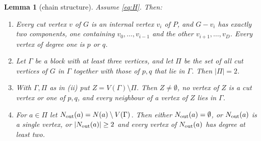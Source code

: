 \documentclass[11pt]{article}
\newtheorem{lemma}[theorem]{Lemma}
\theoremstyle{definition}
\theoremstyle{remark}
\newcommand{\D}{D}
\begin{document}
\begin{lemma}[chain structure]\label{lem:chain}
Assume \eqref{eq:H}. Then:
\begin{enumerate}[label=\textup{(\roman*)}]
\item Every cut vertex $v$ of $G$ is an internal vertex $v_i$ of $P$, and $G-v_i$ has exactly
 two components, one containing $v_0,\dots,v_{i-1}$ and the other $v_{i+1},\dots,v_\D$. Every
 vertex of degree one is $p$ or $q$.
\item Let $\Gamma$ be a block with at least three vertices, and let $\Pi$ be the set of all
 cut vertices of $G$ in $\Gamma$ together with those of $p,q$ that lie in $\Gamma$. Then
 $|\Pi|=2$.
\item With $\Gamma,\Pi$ as in \textup{(ii)} put $Z=V(\Gamma)\setminus\Pi$. Then $Z\ne\emptyset$,
 no vertex of $Z$ is a cut vertex or one of $p,q$, and every neighbour of a vertex of $Z$ lies
 in $\Gamma$.
\item For $a\in\Pi$ let $N_{\rm out}(a)=N(a)\setminus V(\Gamma)$. Then either
 $N_{\rm out}(a)=\emptyset$, or $N_{\rm out}(a)$ is a single vertex, or $|N_{\rm out}(a)|\ge2$
 and every vertex of $N_{\rm out}(a)$ has degree at least two.
\end{enumerate}
\end{lemma}
\end{document}
